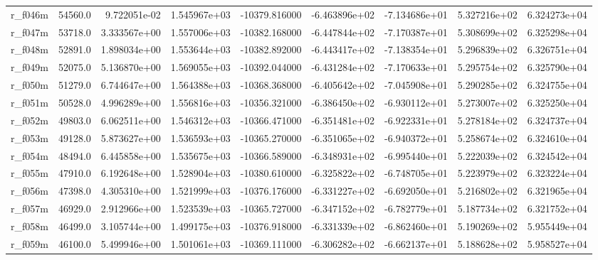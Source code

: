 \documentclass[10pt]{article}
\begin{document}
\begin{landscape}
\begin{longtable}{lrrrrrrrr}
r\_f046m                 &   54560.0 &  9.722051e-02 &  1.545967e+03 & -10379.816000 & -6.463896e+02 & -7.134686e+01 &  5.327216e+02 &  6.324273e+04 \\
r\_f047m                 &   53718.0 &  3.333567e+00 &  1.557006e+03 & -10382.168000 & -6.447844e+02 & -7.170387e+01 &  5.308699e+02 &  6.325298e+04 \\
r\_f048m                 &   52891.0 &  1.898034e+00 &  1.553644e+03 & -10382.892000 & -6.443417e+02 & -7.138354e+01 &  5.296839e+02 &  6.326751e+04 \\
r\_f049m                 &   52075.0 &  5.136870e+00 &  1.569055e+03 & -10392.044000 & -6.431284e+02 & -7.170633e+01 &  5.295754e+02 &  6.325790e+04 \\
r\_f050m                 &   51279.0 &  6.744647e+00 &  1.564388e+03 & -10368.368000 & -6.405642e+02 & -7.045908e+01 &  5.290285e+02 &  6.324755e+04 \\
r\_f051m                 &   50528.0 &  4.996289e+00 &  1.556816e+03 & -10356.321000 & -6.386450e+02 & -6.930112e+01 &  5.273007e+02 &  6.325250e+04 \\
r\_f052m                 &   49803.0 &  6.062511e+00 &  1.546312e+03 & -10366.471000 & -6.351481e+02 & -6.922331e+01 &  5.278184e+02 &  6.324737e+04 \\
r\_f053m                 &   49128.0 &  5.873627e+00 &  1.536593e+03 & -10365.270000 & -6.351065e+02 & -6.940372e+01 &  5.258674e+02 &  6.324610e+04 \\
r\_f054m                 &   48494.0 &  6.445858e+00 &  1.535675e+03 & -10366.589000 & -6.348931e+02 & -6.995440e+01 &  5.222039e+02 &  6.324542e+04 \\
r\_f055m                 &   47910.0 &  6.192648e+00 &  1.528904e+03 & -10380.610000 & -6.325822e+02 & -6.748705e+01 &  5.223979e+02 &  6.323224e+04 \\
r\_f056m                 &   47398.0 &  4.305310e+00 &  1.521999e+03 & -10376.176000 & -6.331227e+02 & -6.692050e+01 &  5.216802e+02 &  6.321965e+04 \\
r\_f057m                 &   46929.0 &  2.912966e+00 &  1.523539e+03 & -10365.727000 & -6.347152e+02 & -6.782779e+01 &  5.187734e+02 &  6.321752e+04 \\
r\_f058m                 &   46499.0 &  3.105744e+00 &  1.499175e+03 & -10376.918000 & -6.331339e+02 & -6.862460e+01 &  5.190269e+02 &  5.955449e+04 \\
r\_f059m                 &   46100.0 &  5.499946e+00 &  1.501061e+03 & -10369.111000 & -6.306282e+02 & -6.662137e+01 &  5.188628e+02 &  5.958527e+04 \\

\end{longtable}
\end{landscape}
\end{document}
